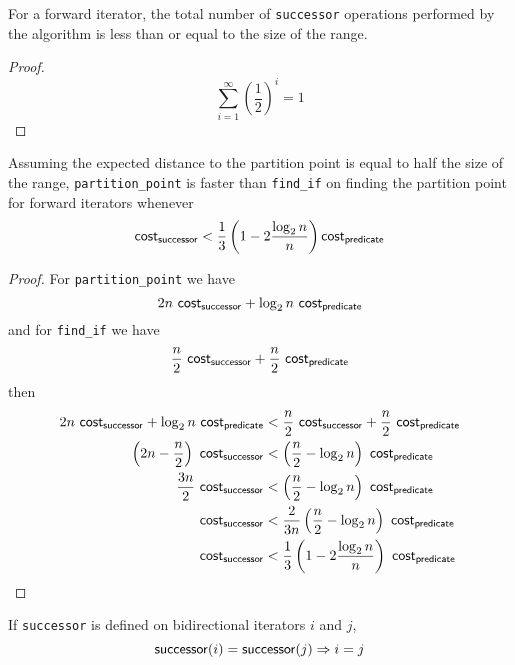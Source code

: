 

\begin{lemma}
	For a forward iterator, the total number of \verb|successor| operations
	performed by the algorithm is less than or equal to the size of the range.
\end{lemma}

\begin{proof}
	\[ \sum_{i=1}^{\infty}{\left ( \frac{1}{2} \right )^i} = 1 \]
\end{proof}

\begin{lemma}
	Assuming the expected distance to the partition point is equal to half the
	size of the range, \verb|partition_point| is faster than \verb|find_if| on
	finding the partition point for forward iterators whenever
	\[ \mathsf{cost}_{\mathsf{successor}} < \frac{1}{3} \left(1 - 2\frac{\log_2n}{n}\right) \mathsf{cost}_{\mathsf{predicate}} \]
\end{lemma}

\begin{proof}
	For \verb|partition_point| we have
	\[ 2n\ \func{cost}_{\func{successor}} + \log_2{n}\ \func{cost}_{\func{predicate}} \]
	and for \verb|find_if| we have
	\[ \frac{n}{2}\ \func{cost}_{\func{successor}} + \frac{n}{2}\ \func{cost}_{\func{predicate}} \]
	then
	\begin{align*}
		2n\ \func{cost}_{\func{successor}} + \log_2{n}\ \func{cost}_{\func{predicate}}
		&< \frac{n}{2}\ \func{cost}_{\func{successor}} + \frac{n}{2}\ \func{cost}_{\func{predicate}}\\
		\left(2n - \frac{n}{2}\right)\ \func{cost}_{\func{successor}}
		&< \left(\frac{n}{2} - \log_2n\right)\ \func{cost}_{\func{predicate}}\\
		\frac{3n}{2}\ \func{cost}_{\func{successor}}
		&< \left(\frac{n}{2} - \log_2n\right)\ \func{cost}_{\func{predicate}}\\
		\func{cost}_{\func{successor}}
		&< \frac{2}{3n}\left(\frac{n}{2} - \log_2n\right)\ \func{cost}_{\func{predicate}}\\
		\func{cost}_{\func{successor}}
		&< \frac{1}{3}\left(1 - 2\frac{\log_2n}{n}\right)\ \func{cost}_{\func{predicate}}
	\end{align*}
\end{proof}

\begin{lemma}
	If \verb|successor| is defined on bidirectional iterators $i$ and $j$,
	\[ \mathsf{successor}(i) = \mathsf{successor}(j) \Rightarrow i = j \]
\end{lemma}

